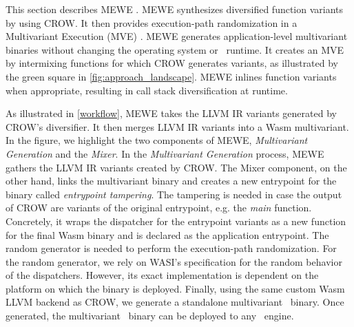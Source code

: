 
\label{section:mewe}

\renewcommand{\tool}{MEWE\xspace}
This section describes MEWE \cite{MEWE}. 
\tool synthesizes diversified function variants by using CROW.
It then provides execution-path randomization in a Multivariant Execution (MVE) \cite{bhatkar03}.
MEWE generates application-level multivariant binaries without changing the operating system or \wasm\ runtime.
It creates an MVE by intermixing functions for which CROW generates variants, as illustrated by the green square in \autoref{fig:approach_landscape}.
\tool inlines function variants when appropriate, resulting in call stack diversification at runtime.



As illustrated in \autoref{workflow}, MEWE takes the LLVM IR variants generated by CROW's diversifier. 
It then merges LLVM IR variants into a Wasm multivariant.
In the figure, we highlight the two components of MEWE, \emph{Multivariant Generation} and the \emph{Mixer}.
In the \emph{Multivariant Generation} process, 
MEWE gathers the LLVM IR variants created by CROW.
The Mixer component, on the other hand, links the multivariant binary and creates a new entrypoint for the binary called \emph{entrypoint tampering}.
The tampering is needed in case the output of CROW are variants of the original entrypoint, e.g. the \emph{main} function.
Concretely, it wraps the dispatcher for the entrypoint variants as a new function for the final Wasm binary and is declared as the application entrypoint.
The random generator is needed to perform the execution-path randomization.
For the random generator, we rely on WASI's specification \cite{WASI} for the random behavior of the dispatchers. 
However, its exact implementation is dependent on the platform on which the binary is deployed. 
Finally, using the same custom Wasm LLVM backend as CROW, we generate a standalone multivariant \wasm\ binary.
Once generated, the multivariant \wasm\ binary can be deployed to any \wasm\ engine. 

